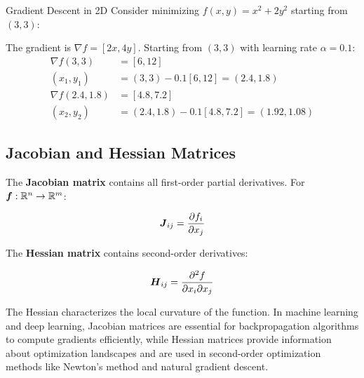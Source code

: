 \begin{examplebox}{Gradient Descent in 2D}
Consider minimizing $f(x, y) = x^2 + 2y^2$ starting from $(3, 3)$:

\begin{center}
\end{center}

The gradient is $\nabla f = [2x, 4y]$. Starting from $(3, 3)$ with learning rate $\alpha = 0.1$:
\begin{align}
\nabla f(3, 3) &= [6, 12] \\
(x_1, y_1) &= (3, 3) - 0.1[6, 12] = (2.4, 1.8) \\
\nabla f(2.4, 1.8) &= [4.8, 7.2] \\
(x_2, y_2) &= (2.4, 1.8) - 0.1[4.8, 7.2] = (1.92, 1.08)
\end{align}
\end{examplebox}

\subsection{Jacobian and Hessian Matrices}

The \textbf{Jacobian matrix} contains all first-order partial derivatives. For $\boldsymbol{f}: \mathbb{R}^n \to \mathbb{R}^m$:

\begin{equation}
\boldsymbol{J}_{ij} = \frac{\partial f_i}{\partial x_j}
\end{equation}

The \textbf{Hessian matrix} contains second-order derivatives:

\begin{equation}
\boldsymbol{H}_{ij} = \frac{\partial^2 f}{\partial x_i \partial x_j}
\end{equation}

The Hessian characterizes the local curvature of the function. In machine learning and deep learning, Jacobian matrices are essential for backpropagation algorithms to compute gradients efficiently, while Hessian matrices provide information about optimization landscapes and are used in second-order optimization methods like Newton's method and natural gradient descent.

